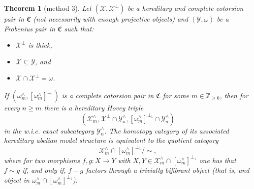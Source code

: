 \documentclass[10pt,reqno]{amsart}
\numberwithin{equation}{section}
\newtheorem{theorem}[definition]{Theorem}
\theoremstyle{remark}
\newcommand{\C}{\mathfrak{C}}
\newcommand{\X}{\mathcal{X}}
\begin{document}
\begin{theorem}[method 3]\label{thm:models_two_bounds-2}
Let $(\mathcal{X},\mathcal{X}^\perp)$ be a hereditary and complete cotorsion pair in $\C$ (not necessarily with enough projective objects) and $(\mathcal{Y},\omega)$ be a Frobenius pair in $\C$ such that:
\begin{itemize}
\item $\mathcal{X}^\perp$ is thick,
\item $\mathcal{X} \subseteq \mathcal{Y}$, and
\item $\mathcal{X} \cap \mathcal{X}^\perp = \omega$.
\end{itemize}  
If $(\omega^\wedge_m, [\omega^\wedge_m]^{\perp_1})$ is a complete cotorsion pair in $\C$ for some $m \in \mathbb{Z}_{\geq 0}$, then for every $n \geq m$ there is a hereditary Hovey triple $$(\mathcal{X}^\wedge_m,\mathcal{X}^\perp \cap \mathcal{Y}^\wedge_n, [\omega^\wedge_m]^{\perp_1} \cap \mathcal{Y}^\wedge_n)$$ in the w.i.c. exact subcategory $\mathcal{Y}^\wedge_n$. The homotopy category of its associated hereditary abelian model structure is equivalent to the quotient category $$\X^\wedge_m \cap [\omega^\wedge_m]^{\perp_1} / \sim,$$ where for two morphisms $f, g \colon X \to Y$ with $X, Y \in \X^\wedge_m \cap [\omega^\wedge_m]^{\perp_1}$ one has that $f \sim g$ if, and only if, $f - g$ factors through a trivially bifibrant object (that is, and object in $\omega^\wedge_m \cap [\omega^\wedge_m]^{\perp_1}$). 
\end{theorem}
\end{document}
